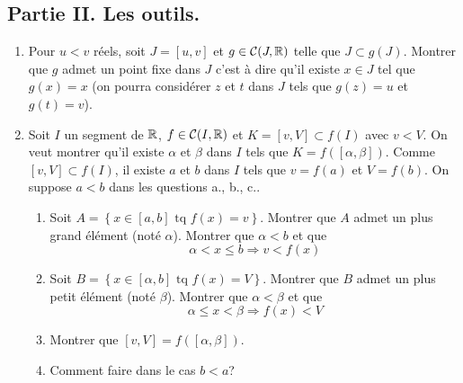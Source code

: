 \subsection*{Partie II. Les outils.}  
\begin{enumerate}
  \item Pour $u < v$ réels, soit $J=\left[ u, v \right]$ et $g \in \mathcal{C}(J,\mathbb{R})$ telle que $J \subset g(J)$. 
  Montrer que $g$ admet un point fixe dans $J$ c'est à dire qu'il existe $x\in J$ tel que $g(x) = x$  (on pourra considérer $z$ et $t$ dans $J$ tels que $g(z)=u$ et $g(t)=v$).
  
  \item Soit $I$ un segment de $\mathbb{R}$, $f \in \mathcal{C}(I,\mathbb{R})$ et $K=\left[ v,V\right] \subset f(I)$ avec $v < V$. 
  On veut montrer qu'il existe $\alpha$ et $\beta$ dans $I$ tels que $K=f(\left[ \alpha, \beta\right])$.\newline
  Comme $\left[ v,V\right]\subset f(I)$, il existe $a$ et $b$ dans $I$ tels que $v=f(a)$ et $V=f(b)$. On suppose $a < b$ dans les questions a., b., c..
\begin{enumerate}
  \item Soit $A = \left\lbrace x\in \left[a,b\right] \text{ tq } f(x) = v \right\rbrace$. Montrer que $A$ admet un plus grand élément (noté $\alpha$). Montrer que $\alpha < b$ et que
  \begin{displaymath}
    \alpha < x \leq b \Rightarrow v < f(x)
  \end{displaymath}
  \item Soit $B = \left\lbrace x\in \left[\alpha,b\right] \text{ tq } f(x) = V \right\rbrace$. Montrer que $B$ admet un plus petit élément (noté $\beta$). Montrer que $\alpha < \beta$ et que
  \begin{displaymath}
    \alpha \leq x < \beta \Rightarrow  f(x) < V
  \end{displaymath}
  \item Montrer que $[v,V] = f(\left[\alpha, \beta \right])$. 
  \item Comment faire dans le cas $b<a$?
\end{enumerate}
\end{enumerate}

